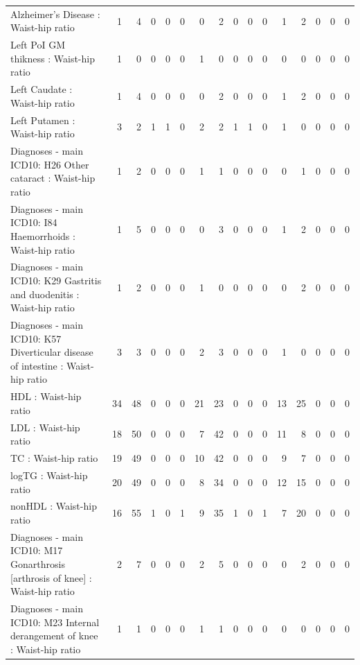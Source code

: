 \begin{table}[ht]
\begin{tabular}{lrrrrrrrrrrrrrrr}
  Alzheimer's Disease : Waist-hip ratio  &   1 &   4 &   0 &   0 &   0 &   0 &   2 &   0 &   0 &   0 &   1 &   2 &   0 &   0 &   0 \\ 
  Left PoI GM thikness : Waist-hip ratio  &   1 &   0 &   0 &   0 &   0 &   1 &   0 &   0 &   0 &   0 &   0 &   0 &   0 &   0 &   0 \\ 
  Left Caudate : Waist-hip ratio  &   1 &   4 &   0 &   0 &   0 &   0 &   2 &   0 &   0 &   0 &   1 &   2 &   0 &   0 &   0 \\ 
  Left Putamen : Waist-hip ratio  &   3 &   2 &   1 &   1 &   0 &   2 &   2 &   1 &   1 &   0 &   1 &   0 &   0 &   0 &   0 \\ 
  Diagnoses - main ICD10: H26 Other cataract : Waist-hip ratio  &   1 &   2 &   0 &   0 &   0 &   1 &   1 &   0 &   0 &   0 &   0 &   1 &   0 &   0 &   0 \\ 
  Diagnoses - main ICD10: I84 Haemorrhoids : Waist-hip ratio  &   1 &   5 &   0 &   0 &   0 &   0 &   3 &   0 &   0 &   0 &   1 &   2 &   0 &   0 &   0 \\ 
  Diagnoses - main ICD10: K29 Gastritis and duodenitis : Waist-hip ratio  &   1 &   2 &   0 &   0 &   0 &   1 &   0 &   0 &   0 &   0 &   0 &   2 &   0 &   0 &   0 \\ 
  Diagnoses - main ICD10: K57 Diverticular disease of intestine : Waist-hip ratio  &   3 &   3 &   0 &   0 &   0 &   2 &   3 &   0 &   0 &   0 &   1 &   0 &   0 &   0 &   0 \\ 
  HDL : Waist-hip ratio  &  34 &  48 &   0 &   0 &   0 &  21 &  23 &   0 &   0 &   0 &  13 &  25 &   0 &   0 &   0 \\ 
  LDL : Waist-hip ratio  &  18 &  50 &   0 &   0 &   0 &   7 &  42 &   0 &   0 &   0 &  11 &   8 &   0 &   0 &   0 \\ 
  TC : Waist-hip ratio  &  19 &  49 &   0 &   0 &   0 &  10 &  42 &   0 &   0 &   0 &   9 &   7 &   0 &   0 &   0 \\ 
  logTG : Waist-hip ratio  &  20 &  49 &   0 &   0 &   0 &   8 &  34 &   0 &   0 &   0 &  12 &  15 &   0 &   0 &   0 \\ 
  nonHDL : Waist-hip ratio  &  16 &  55 &   1 &   0 &   1 &   9 &  35 &   1 &   0 &   1 &   7 &  20 &   0 &   0 &   0 \\ 
  Diagnoses - main ICD10: M17 Gonarthrosis [arthrosis of knee] : Waist-hip ratio  &   2 &   7 &   0 &   0 &   0 &   2 &   5 &   0 &   0 &   0 &   0 &   2 &   0 &   0 &   0 \\ 
  Diagnoses - main ICD10: M23 Internal derangement of knee : Waist-hip ratio  &   1 &   1 &   0 &   0 &   0 &   1 &   1 &   0 &   0 &   0 &   0 &   0 &   0 &   0 &   0 \\ 

\end{tabular}
\end{table}
